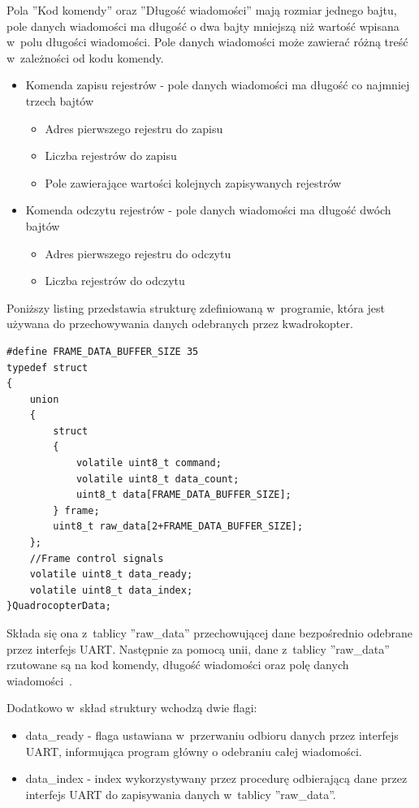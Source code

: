 \documentclass[11pt, twoside]{Thesis} %
\begin{document}
Pola ''Kod komendy'' oraz ''Długość wiadomości'' mają rozmiar jednego bajtu, pole danych wiadomości ma długość o dwa bajty mniejszą niż wartość wpisana w~polu długości wiadomości.
Pole danych wiadomości może zawierać różną treść w~zależności od kodu komendy. 
\begin{itemize}
	\item Komenda zapisu rejestrów - pole danych wiadomości ma długość co najmniej trzech bajtów
	\begin{itemize}
		\item Adres pierwszego rejestru do zapisu
		\item Liczba rejestrów do zapisu
		\item Pole zawierające wartości kolejnych zapisywanych rejestrów
	\end{itemize}
	\item Komenda odczytu rejestrów - pole danych wiadomości ma długość dwóch bajtów
	\begin{itemize}
		\item Adres pierwszego rejestru do odczytu
		\item Liczba rejestrów do odczytu
	\end{itemize} 	
\end{itemize} 

Poniższy listing przedstawia strukturę zdefiniowaną w~programie, która jest używana do przechowywania danych odebranych  przez kwadrokopter.

\begin{lstlisting}
#define FRAME_DATA_BUFFER_SIZE 35
typedef struct
{
    union
    {
        struct
        {
            volatile uint8_t command;
            volatile uint8_t data_count;
            uint8_t data[FRAME_DATA_BUFFER_SIZE];
        } frame;
        uint8_t raw_data[2+FRAME_DATA_BUFFER_SIZE];
    };
    //Frame control signals
    volatile uint8_t data_ready;
    volatile uint8_t data_index;
}QuadrocopterData;
\end{lstlisting}

Składa się ona z~tablicy ''raw\_data'' przechowującej dane bezpośrednio odebrane przez interfejs UART. Następnie za pomocą unii, dane z~tablicy ''raw\_data'' rzutowane są na kod komendy, długość wiadomości oraz polę danych wiadomości~\cite{prog1}.

Dodatkowo w~skład struktury wchodzą dwie flagi:
\begin{itemize}
	\item data\_ready - flaga ustawiana w~przerwaniu odbioru danych przez interfejs UART, informująca program główny o odebraniu całej wiadomości.
	\item data\_index - index wykorzystywany przez procedurę odbierającą dane przez interfejs UART do zapisywania danych w~tablicy ''raw\_data''. 
\end{itemize}
\end{document}
